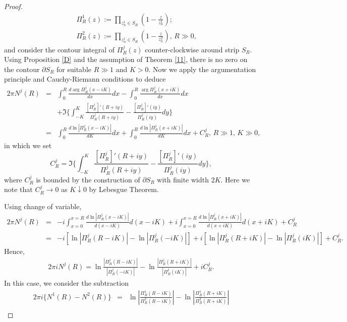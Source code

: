 \documentclass[10pt,a4paper]{article}
\theoremstyle{plain}
\theoremstyle{definition}
\theoremstyle{remark}
\numberwithin{equation}{section}
\begin{document}
\begin{proof}
\begin{eqnarray}
&&\Pi^{1}_{R}(z):=\prod_{z^{1}_{n}\in S_{R}}(1-\frac{z}{z_{n}^{1}});\\
&&\Pi^{2}_{R}(z):=\prod_{z^{1}_{n}\in S_{R}}(1-\frac{z}{z_{n}^{2}}),\,R\gg0,
\end{eqnarray}
and consider the contour integral of $\Pi^{j}_{R}(z)$ counter-clockwise around strip $S_{R}$.
Using Proposition \ref{D} and the assumption of Theorem \ref{11}, there is no zero on the contour $\partial S_{R}$ for suitable $R\gg1$ and $K>0$.
Now we apply the argumentation principle and Cauchy-Riemann conditions to deduce \begin{eqnarray*}\nonumber
2\pi N^{j}(R)&=&\int_{0}^{R}\frac{d\arg\Pi_{R}^{j}(x-iK)}{dx}dx-\int_{0}^{R}\frac{\arg \Pi_{R}^{j}(x+iK)}{dx}dx
\\&&+\Im\big\{\int_{-K}^{K} \frac{  [\Pi_{R}^{j}]'(R+iy)}{\Pi_{R}^{j}(R+iy)}-\frac{[\Pi_{R}^{j}]'(iy)}{\Pi_{R}^{j}(iy)} dy\big\}\\\nonumber
&=&\int_{0}^{R}\frac{d\ln | \Pi_{R}^{j}(x-iK)|}{dK}dx+\int_{0}^{R}\frac{d\ln |\Pi_{R}^{j}(x+iK)|}{dK}dx+C_{R}^{j},\,R\gg1,\,K\gg0,
\end{eqnarray*}
in which we set 
\begin{equation}
C_{R}^{j}=\Im\big\{\int_{-K}^{K}  \frac{ [\Pi_{R}^{j}]'(R+iy)}{\Pi_{R}^{j}(R+iy)}-\frac{[\Pi_{R}^{j}]'(iy)}{\Pi_{R}^{j}(iy)}  dy\big\},
\end{equation}
where $C_{R}^{j}$ is bounded by the construction of $\partial 
S_{R}$ with finite width $2K$. Here we note that $C_{R}^{j}\rightarrow0$ as $K\downarrow0$ by Lebesgue Theorem.
\par
Using change of variable,
\begin{eqnarray*}
2\pi N^{j}(R)&=&-i\int_{x=0}^{x=R}\frac{d\ln | \Pi_{R}^{j}(x-iK)|}{d(x-iK)}d(x-iK)+i\int_{x=0}^{x=R}\frac{d\ln |\Pi_{R}^{j}(x+iK)|}{d(x+iK)}d(x+iK)+C_{R}^{j}\\
&=&-i[\ln | \Pi_{R}^{j}(R-iK)|- \ln| \Pi_{R}^{j}(-iK)|]+i[ \ln|\Pi_{R}^{j}(R+iK)|-\ln|\Pi_{R}^{j}(iK)|]+C_{R}^{j}.
\end{eqnarray*}
Hence,
\begin{eqnarray*}
2\pi iN^{j}(R)=\ln\frac{|\Pi_{R}^{j}(R-iK)|}{|\Pi_{R}^{j}(-iK)|}-\ln\frac{|\Pi_{R}^{j}(R+iK)|}{|\Pi_{R}^{j}(iK)|}+iC_{R}^{j}.
\end{eqnarray*}
In this case, we consider the subtraction
\begin{eqnarray*}
2\pi i\{ N^{1}(R)-N^{2}(R)\}&=&\ln|\frac{\Pi_{R}^{1}(R-iK)}{\Pi_{R}^{2}(R-iK)}|-\ln|\frac{\Pi_{R}^{1}(R+iK)}{\Pi_{R}^{2}(R+iK)}|\\

\end{eqnarray*}
\end{proof}
\end{document}
